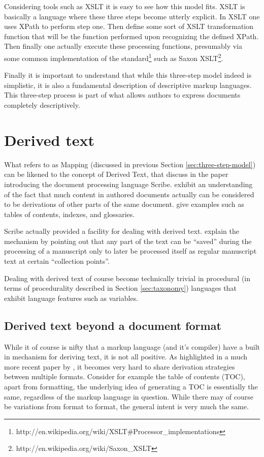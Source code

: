 \documentclass{scrreprt}
\begin{document}
Considering tools such as XSLT it is easy to see how this model fits. XSLT is basically a language where these three steps become utterly explicit. In XSLT one uses XPath to perform step one. Then define some sort of XSLT transformation function that will be the function performed upon recognizing the defined XPath. Then finally one actually execute these processing functions, presumably via some common implementation of the standard\footnote{http://en.wikipedia.org/wiki/XSLT\#Processor\_implementations} such as Saxon XSLT\footnote{http://en.wikipedia.org/wiki/Saxon\_XSLT}.

Finally it is important to understand that while this three-step model indeed is simplistic, it is also a fundamental description of descriptive markup languages. This three-step process is part of what allows authors to express documents completely descriptively.





\section{Derived text}
\label{sec:theory:derived-text}
What \citet{goldfarb} refers to as Mapping (discussed in previous Section \ref{sec:three-step-model}) can be likened to the concept of Derived Text, that \citet{reid} discuss in the paper introducing the document processing language Scribe. \citet{reid} exhibit an understanding of the fact that much content in authored documents actually can be considered to be derivations of other parts of the same document. \citet{reid} give examples such as tables of contents, indexes, and glossaries.

Scribe actually provided a facility for dealing with derived text. \citet{reid} explain the mechanism by pointing out that any part of the text can be ``saved'' during the processing of a manuscript only to later be processed itself as regular manuscript text at certain ``collection points''.

Dealing with derived text of course become technically trivial in procedural (in terms of procedurality described in Section \ref{sec:taxonomy}) languages that exhibit language features such as variables.


\subsection{Derived text beyond a document format}
While it of course is nifty that a markup language (and it's compiler) have a built in mechanism for deriving text, it is not all positive. As highlighted in a much more recent paper by \citet{krijnen}, it becomes very hard to share derivation strategies between multiple formats. Consider for example the table of contents (TOC), apart from formatting, the underlying idea of generating a TOC is essentially the same, regardless of the markup language in question. While there may of course be variations from format to format, the general intent is very much the same.
\end{document}
